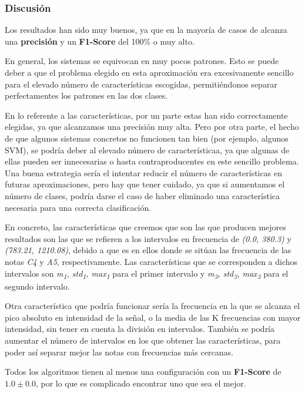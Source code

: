 \documentclass[12pt]{article}
\begin{document}
\subsubsection{Discusión}
Los resultados han sido muy buenos, ya que en la mayoría de casos de alcanza una \textbf{precisión} y un \textbf{F1-Score} del 100\% o muy alto. 

\bigskip
En general, los sistemas se equivocan en muy pocos patrones. Esto se puede deber a que el problema elegido en esta aproximación
era excesivamente sencillo para el elevado número de características escogidas, permitiéndonos separar perfectamentes los patrones
en las dos clases.

\bigskip
En lo referente a las características, por un parte estas han sido correctamente elegidas, ya que alcanzamos una precisión muy alta. Pero 
por otra parte, el hecho de que algunos sistemas concretos no 
funcionen tan bien (por ejemplo, algunos SVM), se podría deber al elevado número de característicaa, 
ya que algunas de ellas pueden ser innecesarias o hasta contraproducentes en este sencillo problema. Una buena estrategia sería el intentar 
reducir el número de características en futuras aproximaciones, pero hay que tener cuidado, ya que si aumentamos el número de clases, 
podría darse el caso de haber eliminado una característica necesaria para una correcta clasificación.

En concreto, las características que creemos que son las que producen mejores resultados son las que se refieren a los intervalos 
en frecuencia de \textit{(0.0, 380.3)} y \textit{(783.21, 1210.08)}, debido a que es en ellos donde se sitúan las frecuencia de las notas 
\textit{C4} y \textit{A5}, respectivamente.
Las características que se corresponden a dichos intervalos son \textit{m\textsubscript{1}, std\textsubscript{1}, max\textsubscript{1}}
para el primer intervalo y \textit{m\textsubscript{3}, std\textsubscript{3}, max\textsubscript{3}} para el segundo intervalo.

Otra característica que podría funcionar sería la frecuencia en la que se alcanza el pico absoluto en intensidad de la señal,
o la media de las K frecuencias con mayor intensidad, sin tener en cuenta la división en intervalos. También se podría aumentar
el número de intervalos en los que obtener las características, para poder así separar mejor las notas con frecuencias más cercanas.

\bigskip
Todos los algoritmos tienen al menos una configuración con un \textbf{F1-Score} de $1.0 \pm 0.0$, por lo que es complicado encontrar uno que sea el mejor.
\end{document}

